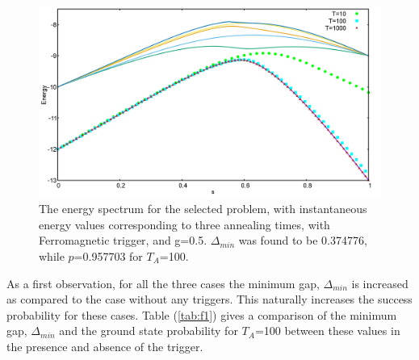 \documentclass[12]{article}
\begin{document}
\begin{figure}[H]
\centering 
\includegraphics[scale=0.3]{528_s12_F_g0.png}
\caption{The energy spectrum for the selected problem, with instantaneous energy values corresponding to three annealing times, with Ferromagnetic trigger, and g=0.5. $\Delta_{min}$ was found to be 0.374776, while $p$=0.957703 for $T_A$=100.}
\label{fig:f3}
\end{figure}
As a first observation, for all the three cases the minimum gap, $\Delta_{min}$ is increased as compared to the case without any triggers. This naturally increases the success probability for these cases. Table (\ref{tab:f1}) gives a comparison of the minimum gap, $\Delta_{min}$ and the ground state probability for $T_A$=100 between these values in the presence and absence of the trigger. 
\end{document}
